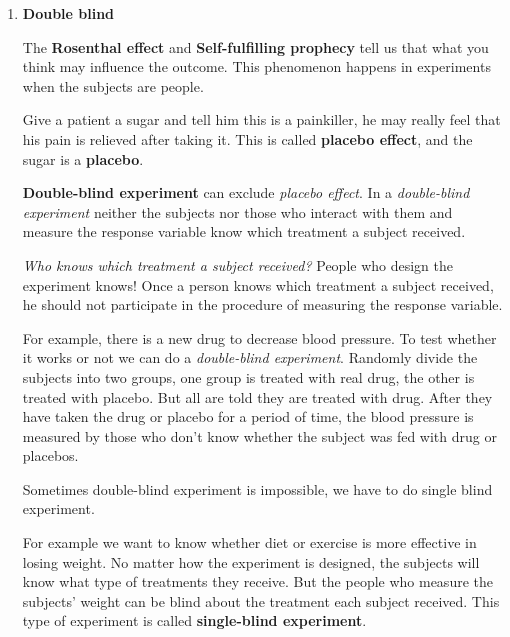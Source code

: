 \documentclass[a4paper, 12pt,twoside]{book}
\begin{document}
\begin{enumerate}[(1)]
   \item \textbf{Double blind}
   \vspace{0.3cm}
  
  The \textbf{Rosenthal effect} and \textbf{Self-fulfilling prophecy} tell us that what you think may influence the outcome. This phenomenon happens in experiments when the subjects are people. 
  
  Give a patient a sugar and tell him this is a painkiller, he may really feel that his pain is relieved after taking it. This is called \textbf{placebo effect}, and the sugar is a \textbf{placebo}.
  
  \textbf{Double-blind experiment} can exclude \textit{placebo effect}. In a \textit{double-blind experiment} neither the subjects nor those who interact with them and measure the response variable know which treatment a subject received.
  \vspace{0.3cm}
  
  \colorbox{babypink}{\parbox{0.92\textwidth}{
  \textit{Who knows which treatment a subject received?} People who design the experiment knows! Once a person knows which treatment a subject received, he should not participate in the procedure of measuring the response variable.
  }}
  \vspace{0.3cm}
  
 For example, there is a new drug to decrease blood pressure. To test whether it works or not we can do a \textit{double-blind experiment}. Randomly divide the subjects into two groups, one group is treated with real drug, the other is treated with placebo.  But all are told they are treated with drug. After they have taken the drug or placebo for a period of time, the blood pressure is measured by those who don't know whether the subject was fed with drug or placebos. 
 \vspace{0.3cm}
 
   \colorbox{babypink}{\parbox{0.92\textwidth}{
Sometimes double-blind experiment is impossible, we have to do single blind experiment.
  }}
  \vspace{0.3cm}
  
  For example we want to know whether diet or exercise is more effective in losing weight. No matter how the experiment is designed, the subjects will know what type of treatments they receive. But the people who measure the subjects' weight can be blind about the treatment each subject received. This type of experiment is called \textbf{single-blind experiment}.
  \vspace{0.3cm}
  \newpage
 

\end{enumerate}
\end{document}
